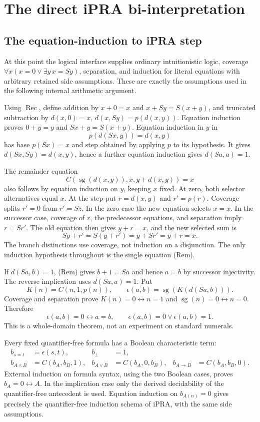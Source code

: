 \section{The direct iPRA bi-interpretation}\label{sec:biinterp}
\subsection{The equation-induction to iPRA step}

At this point the logical interface supplies ordinary intuitionistic logic,
coverage $\forall x(x=0\lor\exists y\,x=Sy)$, separation, and induction
for literal equations with arbitrary retained side assumptions. These are
exactly the assumptions used in the following internal arithmetic argument.

Using $\operatorname{Rec}$, define addition by $x+0=x$ and
$x+Sy=S(x+y)$, and truncated subtraction by
$d(x,0)=x$, $d(x,Sy)=p(d(x,y))$. Equation induction proves
$0+y=y$ and $Sx+y=S(x+y)$. Equation induction in $y$ in
\[
 p(d(Sx,y))=d(x,y)
\]
has base $p(Sx)=x$ and step obtained by applying $p$ to its hypothesis.
It gives $d(Sx,Sy)=d(x,y)$, hence a further equation induction gives
$d(Sa,a)=1$.

The remainder equation
\[
 C(\operatorname{sg}(d(x,y)),x,y+d(x,y))=x
\tag{Rem}
\]
also follows by equation induction on $y$, keeping $x$ fixed. At zero,
both selector alternatives equal $x$. At the step put $r=d(x,y)$ and
$r'=p(r)$. Coverage splits $r'=0$ from $r'=Sz$. In the zero case
the new equation selects $x=x$. In the successor case, coverage of $r$,
the predecessor equations, and separation imply $r=Sr'$. The old equation
then gives $y+r=x$, and the new selected sum is
\[
 Sy+r'=S(y+r')=y+Sr'=y+r=x.
\]
The branch distinctions use coverage, not induction on a disjunction.
The only induction hypothesis throughout is the single equation (Rem).

If $d(Sa,b)=1$, (Rem) gives $b+1=Sa$ and hence $a=b$ by
successor injectivity. The reverse implication uses $d(Sa,a)=1$.
Put
\[
 K(n)=C(n,1,p(n)),\qquad
 \epsilon(a,b)=\operatorname{sg}(K(d(Sa,b))).
\]
Coverage and separation prove $K(n)=0\leftrightarrow n=1$ and
$\operatorname{sg}(n)=0\leftrightarrow n=0$. Therefore
\[
 \epsilon(a,b)=0\leftrightarrow a=b,
 \qquad \epsilon(a,b)=0\lor\epsilon(a,b)=1.
\]
This is a whole-domain theorem, not an experiment on standard numerals.

Every fixed quantifier-free formula has a Boolean characteristic term:
\[
\begin{aligned}
 b_{s=t}&=\epsilon(s,t),& b_\bot&=1,\\
 b_{A\land B}&=C(b_A,b_B,1),&
 b_{A\lor B}&=C(b_A,0,b_B),&
 b_{A\to B}&=C(b_A,b_B,0).
\end{aligned}
\]
External induction on formula syntax, using the two Boolean cases, proves
$b_A=0\leftrightarrow A$. In the implication case only the derived
decidability of the quantifier-free antecedent is used. Equation induction
on $b_{A(n)}=0$ gives precisely the quantifier-free induction schema of
iPRA, with the same side assumptions.


